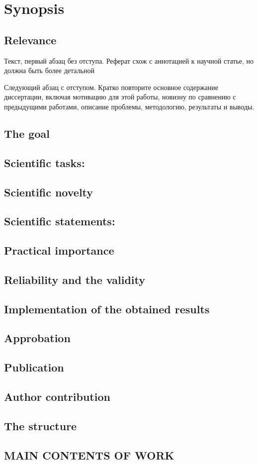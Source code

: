 \chapter*{Synopsis}
\section*{Relevance}
\noindent Текст, первый абзац без отступа. Реферат схож с аннотацией к научной статье, но должна быть более детальной

Следующий абзац с отступом. Кратко повторите основное содержание диссертации, включая мотивацию для этой работы, новизну по сравнению с предыдущими работами, описание проблемы, методологию, результаты и выводы.
\section*{The goal}
\section*{Scientific tasks:}
\section*{Scientific novelty}
\section*{Scientific statements:}
\section*{Practical importance}
\section*{Reliability and the validity}
\section*{Implementation of the obtained results}
\section*{Approbation}
\section*{Publication}
\section*{Author contribution}
\section*{The structure}
\section*{MAIN CONTENTS OF WORK}